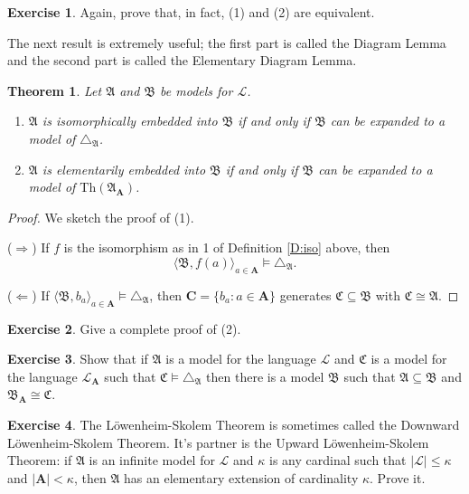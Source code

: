 \documentclass[titlepage, oneside]{amsbook}
\theoremstyle{plain}
\newtheorem{theorem}{Theorem}
\theoremstyle{definition}
\newtheorem{exercise}{Exercise}
\theoremstyle{remark}
\newcommand{\tria}[1]{\ensuremath{\triangle_{\mathfrak{#1}}}}
\newcommand{\lan}{\ensuremath{\mathcal{L}}}
\newcommand{\ma}{\ensuremath{\mathfrak{A}}}
\newcommand{\mb}{\ensuremath{\mathfrak{B}}}
\newcommand{\mc}{\ensuremath{\mathfrak{C}}}
\newcommand{\ba}{\ensuremath{\mathbf{A}}}
\begin{document}
\begin{exercise} Again, prove that, in fact, (1) and (2) are equivalent.
\end{exercise}



The next result is extremely useful; the first part is called the Diagram Lemma and the second part is called the Elementary Diagram Lemma.

\begin{theorem}
%
Let $\ma$ and $\mb$ be models for $\lan$.
\begin{enumerate}
\item $\ma$ is isomorphically embedded into $\mb$ if and only if $\mb$ can be
expanded to a model of $\tria A$.
\item $\ma$ is elementarily embedded into $\mb$ if and only if $\mb$ can be expanded to
a model of $\mbox{Th}(\ma_\ba)$.
\end{enumerate}

\end{theorem}

\begin{proof}  We sketch the proof of (1).

($\Rightarrow$) If $f$ is the isomorphism as in 1 of Definition \ref{D:iso} above, then 
\[
        \langle \mb , f(a) \rangle_{a \in \ba} \models \tria A. 
\]

($\Leftarrow$) If $\langle \mb , b_a \rangle_{a \in \ba } \models \tria A$, then $\mathbf{C} = \{ b_a : a \in \mathbf{A} \}$ generates $\mc \subseteq \mb$ with 
$\mc \cong \ma$.

\end{proof}

\begin{exercise}
Give a complete proof of (2).
\end{exercise}

\begin{exercise} \label{X:diagram} 
Show that if $\ma$ is a model for the language $\lan$ and $\mc$ is a model for the language $\lan _{\mathbf{A}}$ such that $\mc \models \tria A $ then there is a model $\mb$ such that $\ma \subseteq \mb$ and $\mb _{\mathbf{A}} \cong \mc$.
\end{exercise}

%
%
\begin{exercise} The  L\"{o}wenheim-Skolem Theorem is sometimes called the Downward
L\"{o}wenheim-Skolem Theorem. It's partner is the Upward L\"{o}wenheim-Skolem Theorem: if $\mathfrak{A}$ is an infinite model for $\mathcal{L}$ and $\kappa$
is any cardinal such that $ |\mathcal{L} |\leq \kappa $ and 
$|\mathbf{A} | < \kappa $, then $\ma$ has an elementary extension of cardinality $\kappa$. Prove it.
\end{exercise}
\end{document}
